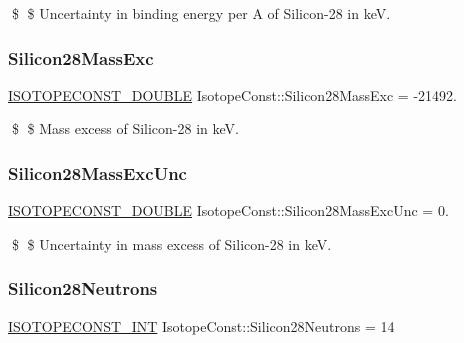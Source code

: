 \$ \$ Uncertainty in binding energy per A of Silicon-\/28 in keV. \mbox{\label{group___isotope_const-_silicon-_si28_ga5017203355db343a68bb5db3ee888903}} 
\subsubsection{\texorpdfstring{Silicon28\+Mass\+Exc}{Silicon28MassExc}}
{\footnotesize\ttfamily \mbox{\hyperlink{group___isotope_const-_macros_ga8f45a7272ce02c0b4c65c44636ed719a}{I\+S\+O\+T\+O\+P\+E\+C\+O\+N\+S\+T\+\_\+\+D\+O\+U\+B\+LE}} Isotope\+Const\+::\+Silicon28\+Mass\+Exc = -\/21492.}

\$ \$ Mass excess of Silicon-\/28 in keV. \mbox{\label{group___isotope_const-_silicon-_si28_ga4d6bd791b6cf5e27bbc90f328961ca22}} 
\subsubsection{\texorpdfstring{Silicon28\+Mass\+Exc\+Unc}{Silicon28MassExcUnc}}
{\footnotesize\ttfamily \mbox{\hyperlink{group___isotope_const-_macros_ga8f45a7272ce02c0b4c65c44636ed719a}{I\+S\+O\+T\+O\+P\+E\+C\+O\+N\+S\+T\+\_\+\+D\+O\+U\+B\+LE}} Isotope\+Const\+::\+Silicon28\+Mass\+Exc\+Unc = 0.}

\$ \$ Uncertainty in mass excess of Silicon-\/28 in keV. \mbox{\label{group___isotope_const-_silicon-_si28_ga084cc57cdde125e2c2ad7a2d3385153a}} 
\subsubsection{\texorpdfstring{Silicon28\+Neutrons}{Silicon28Neutrons}}
{\footnotesize\ttfamily \mbox{\hyperlink{group___isotope_const-_macros_ga5f18360b3e99483a35c32d789e62621c}{I\+S\+O\+T\+O\+P\+E\+C\+O\+N\+S\+T\+\_\+\+I\+NT}} Isotope\+Const\+::\+Silicon28\+Neutrons = 14}

